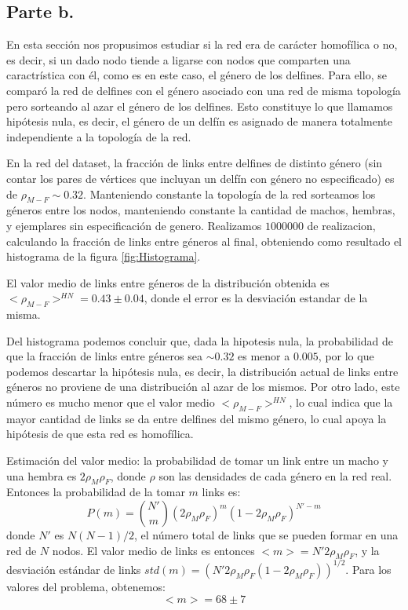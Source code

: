 \subsection{Parte b.}

\par En esta sección nos propusimos estudiar si la red era de carácter homofílica o no, es decir, si un dado nodo tiende a ligarse con nodos que comparten una caractrística con él, como es en este caso, el género de los delfines.
Para ello, se comparó la red de delfines con el género asociado con una red de misma topología pero sorteando al azar el género de los delfines. Esto constituye lo que llamamos hipótesis nula, es decir, el género de un delfín es asignado de manera totalmente independiente a la topología de la red.
\par En la red del dataset, la fracción de links entre delfines de distinto género (sin contar los pares de vértices que incluyan un delfín con género no especificado) es de $\rho_{M-F} \sim 0.32$. Manteniendo constante la topología de la red sorteamos los géneros entre los nodos, manteniendo constante la cantidad de machos, hembras, y ejemplares sin especificación de genero. Realizamos $1000000$ de realizacion, calculando la fracción de links entre géneros al final, obteniendo como resultado el histograma de la figura \ref{fig:Histograma}.
\par El valor medio de links entre géneros de la distribución obtenida es $<\rho_{M-F}>^{HN} = 0.43 \pm 0.04$, donde el error es la desviación estandar de la misma.
\par Del histograma podemos concluir que, dada la hipotesis nula, la probabilidad de que la fracción de links entre géneros sea $\sim 0.32$ es menor a $0.005$, por lo que podemos descartar la hipótesis nula, es decir, la distribución actual de links entre géneros no proviene de una distribución al azar de los mismos. Por otro lado, este número es mucho menor que el valor medio $<\rho_{M-F}>^{HN}$, lo cual indica que la mayor cantidad de links se da entre delfines del mismo género, lo cual apoya la hipótesis de que esta red es homofílica.
\par Estimación del valor medio: la probabilidad de tomar un link entre un macho y una hembra es $2 \rho_{M} \rho_{F}$, donde $\rho$ son las densidades de cada género en la red real. Entonces la probabilidad de la tomar $m$ links es:
\begin{equation}
	P(m) = {N' \choose m} (2 \rho_{M} \rho_{F})^{m} (1 - 2 \rho_{M} \rho_{F})^{N' - m}
\end{equation}
donde $N'$ es $N(N-1)/2$, el número total de links que se pueden formar en una red de $N$ nodos. El valor medio de links es entonces $<m> = N' 2 \rho_{M} \rho_{F}$, y la desviación estándar de links $std(m) = (N' 2 \rho_{M} \rho_{F} (1 - 2 \rho_{M} \rho_{F}))^{1/2}$. Para los valores del problema, obtenemos:
\begin{equation}
	<m> = 68 \pm 7 
\end{equation}

